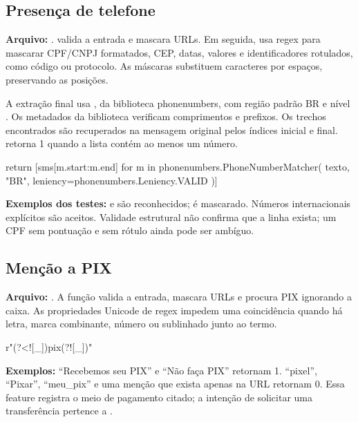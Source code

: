 \clearpage
\subsection{Presença de telefone}
\textbf{Arquivo:} .  valida a entrada e mascara URLs. Em seguida, usa regex para mascarar CPF/CNPJ formatados, CEP, datas, valores e identificadores rotulados, como código ou protocolo. As máscaras substituem caracteres por espaços, preservando as posições.

A extração final usa , da biblioteca phonenumbers, com região padrão BR e nível . Os metadados da biblioteca verificam comprimentos e prefixos. Os trechos encontrados são recuperados na mensagem original pelos índices inicial e final.  retorna 1 quando a lista contém ao menos um número.

\begin{codigofonte}
return [sms[m.start:m.end]
        for m in phonenumbers.PhoneNumberMatcher(
            texto, "BR",
            leniency=phonenumbers.Leniency.VALID
        )]
\end{codigofonte}

\textbf{Exemplos dos testes:}  e  são reconhecidos;  é mascarado. Números internacionais explícitos são aceitos. Validade estrutural não confirma que a linha exista; um CPF sem pontuação e sem rótulo ainda pode ser ambíguo.

\subsection{Menção a PIX}
\textbf{Arquivo:} . A função  valida a entrada, mascara URLs e procura PIX ignorando a caixa. As propriedades Unicode de regex impedem uma coincidência quando há letra, marca combinante, número ou sublinhado junto ao termo.

\begin{codigofonte}
r"(?<![_])pix(?![_])"
\end{codigofonte}

\textbf{Exemplos:} ``Recebemos seu PIX'' e ``Não faça PIX'' retornam 1. ``pixel'', ``Pixar'', ``meu\_\allowbreak{}pix'' e uma menção que exista apenas na URL retornam 0. Essa feature registra o meio de pagamento citado; a intenção de solicitar uma transferência pertence a .

